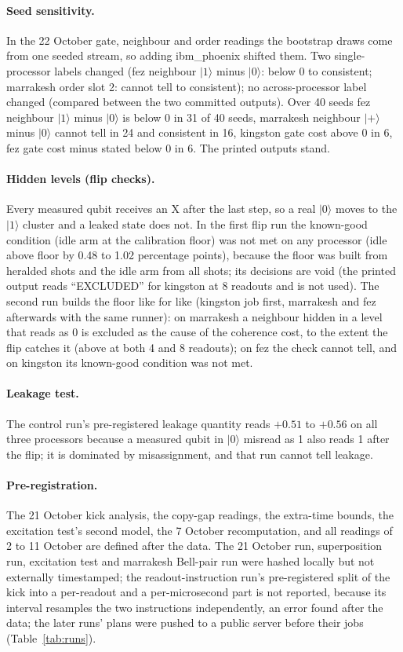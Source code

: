 \documentclass[reprint,amsmath,amssymb,aps,superscriptaddress,nofootinbib]{revtex4-2}
\begin{document}
\paragraph*{Seed sensitivity.} In the 22 October gate, neighbour and order readings the bootstrap draws come from one seeded stream, so adding ibm\_phoenix shifted them. Two single-processor labels changed (fez neighbour $|1\rangle$ minus $|0\rangle$: below 0 to consistent; marrakesh order slot 2: cannot tell to consistent); no across-processor label changed (compared between the two committed outputs). Over 40 seeds fez neighbour $|1\rangle$ minus $|0\rangle$ is below 0 in 31 of 40 seeds, marrakesh neighbour $|+\rangle$ minus $|0\rangle$ cannot tell in 24 and consistent in 16, kingston gate cost above 0 in 6, fez gate cost minus stated below 0 in 6. The printed outputs stand.

\paragraph*{Hidden levels (flip checks).} Every measured qubit receives an X after the last step, so a real $|0\rangle$ moves to the $|1\rangle$ cluster and a leaked state does not. In the first flip run the known-good condition (idle arm at the calibration floor) was not met on any processor (idle above floor by 0.48 to 1.02 percentage points), because the floor was built from heralded shots and the idle arm from all shots; its decisions are void (the printed output reads ``EXCLUDED'' for kingston at 8 readouts and is not used). The second run builds the floor like for like (kingston job first, marrakesh and fez afterwards with the same runner): on marrakesh a neighbour hidden in a level that reads as 0 is excluded as the cause of the coherence cost, to the extent the flip catches it (above at both 4 and 8 readouts); on fez the check cannot tell, and on kingston its known-good condition was not met.

\paragraph*{Leakage test.} The control run's pre-registered leakage quantity reads $+0.51$ to $+0.56$ on all three processors because a measured qubit in $|0\rangle$ misread as 1 also reads 1 after the flip; it is dominated by misassignment, and that run cannot tell leakage.

\paragraph*{Pre-registration.} The 21 October kick analysis, the copy-gap readings, the extra-time bounds, the excitation test's second model, the 7 October recomputation, and all readings of 2 to 11 October are defined after the data. The 21 October run, superposition run, excitation test and marrakesh Bell-pair run were hashed locally but not externally timestamped; the readout-instruction run's pre-registered split of the kick into a per-readout and a per-microsecond part is not reported, because its interval resamples the two instructions independently, an error found after the data; the later runs' plans were pushed to a public server before their jobs (Table~\ref{tab:runs}).
\end{document}
